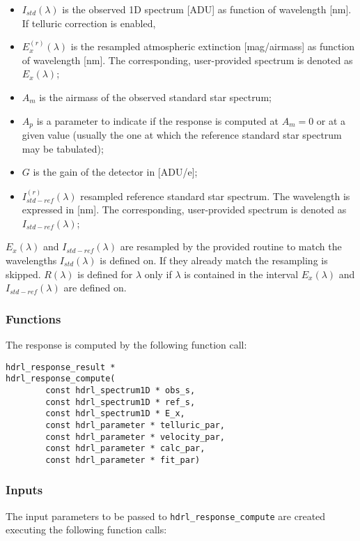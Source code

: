 \begin{itemize}

\item $I_{std}(\lambda)$ is the observed 1D spectrum [ADU] as function of wavelength [nm]. If telluric correction is enabled, 

\item  $E_x^{(r)}(\lambda)$ is the resampled atmospheric extinction [mag/airmass] as function of wavelength [nm]. The corresponding, user-provided spectrum is denoted as $E_x(\lambda)$;

\item $A_m$ is the airmass of the observed standard star spectrum;

\item $A_p$ is a parameter to indicate if the response is computed at $A_m=0$ or at a given value (usually the one at which the reference standard star spectrum may be tabulated);

\item $G$ is the gain  of the detector in [ADU/e];

\item $I_{std-ref}^{(r)}(\lambda)$ resampled reference standard star spectrum. The wavelength is expressed in [nm]. The corresponding, user-provided spectrum is denoted as $I_{std-ref}(\lambda)$; 
\end{itemize} 

$E_x(\lambda)$  and $I_{std-ref}(\lambda)$ are resampled by the provided routine to match the wavelengths $I_{std}(\lambda)$ is defined on. If they already match the resampling is skipped. $R(\lambda)$ is defined for $\lambda$ only if $\lambda$ is contained in the interval $E_x(\lambda)$  and $I_{std-ref}(\lambda)$ are defined on. 

\subsubsection{Functions}
The response is computed by the following function call:

\begin{lstlisting}
hdrl_response_result *
hdrl_response_compute(
        const hdrl_spectrum1D * obs_s,
        const hdrl_spectrum1D * ref_s,
        const hdrl_spectrum1D * E_x,
        const hdrl_parameter * telluric_par,
        const hdrl_parameter * velocity_par,
        const hdrl_parameter * calc_par,
        const hdrl_parameter * fit_par)
\end{lstlisting}

\subsubsection{Inputs}
\label{sec:algorithms:response:inputs}
The input parameters to be passed to \verb+hdrl_response_compute+ are created executing the following function calls:

